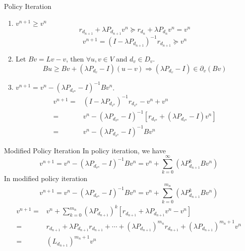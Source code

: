 \documentclass{beamer}
\begin{document}
\begin{frame}[shrink]{Policy Iteration}
    \begin{enumerate}
        \item $ v^{n+1} \ge v^{n} $
                \[
                   r_{d_{n+1}} + \lambda P _{d_{n+1}}v^n \succeq r_{d_n} + \lambda P_{d_{n}} v^n = v^n
                \]
                \[
                    v^{n+1} = {(I - \lambda P_{d_{n+1}})}^{-1} r_{d_{n+1}} \succeq v^{n}
                \]
        \item Let $ Bv = Lv - v $, then $ \forall u,v \in V $ and $ d_v \in D_v $.
            \[
                Bu \ge Bv + (\lambda P_{d_{v}} - I)(u-v) \Rightarrow
                (\lambda P_{d_{v}} - I) \in \partial_{v} (Bv)
            \]
        \item $ v^{n+1} = v^n - {(\lambda P _{d_{v^{n}}} - I) }^{-1} B v^{n} $.
            \begin{align*}
                v^{n+1} =& {(I - \lambda P_{d_{v^n}})}^{-1} r_{d_{v^{n}}} - v^n + v^n\\
                =& v^n - {(\lambda P_{d_{v^n}} - I)}^{-1} \left[ r_{d_{v^{n}}} +  {(\lambda P_{d_{v^n}} - I)}v^n \right]\\
                =& v^n - {(\lambda P _{d_{v^{n}}} - I) }^{-1} B v^{n}
            \end{align*}
    \end{enumerate}
\end{frame}

\begin{frame}[shrink]{Modified Policy Iteration}
    In policy iteration, we have
    \[
        v^{n+1} = v^n - {(\lambda P _{d_{v^{n}}} - I) }^{-1} B v^{n} = v^n + \sum^{\infty}_{k = 0} {\left( \lambda P_{d_{n+1}}^k B v^n \right)}
    \]    
    In modified policy iteration
    \[
        v^{n+1} = v^n - {(\lambda P _{d_{v^{n}}} - I) }^{-1} B v^{n} = v^n + \sum^{m_n}_{k = 0} {\left( \lambda P_{d_{n+1}}^k B v^n \right)}
    \]    
    \begin{align*}
            v^{n+1} =& v^n + \sum^{m_n}_{k=0} {\left( \lambda P_{d_{n+1}} \right)}^k \left[ r_{d_{n+1}} + \lambda P_{d_{n+1}} v^n - v^n \right]\\
            =& r_{d_{n+1}} + \lambda P_{d_{n+1}}r_{d_{n+1}} + \cdots + {\left(\lambda P_{d_{n+1}}\right)}^{m_n}r_{d_{n+1}} + {\left( \lambda P_{d_{n+1}} \right)}^{m_n + 1} v^n\\
            =& {(L_{d_{n+1}})}^{m_n+1}v^n
    \end{align*}
\end{frame}
\end{document}
